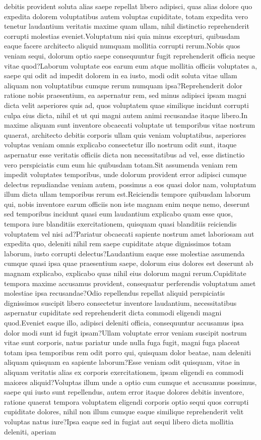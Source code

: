 \documentclass[letterpaper]{article} %
\begin{document}
debitis provident soluta alias saepe repellat libero adipisci, quas alias dolore quo expedita dolorem voluptatibus autem voluptas cupiditate, totam expedita vero tenetur laudantium veritatis maxime quam ullam, nihil distinctio reprehenderit corrupti molestias eveniet.Voluptatum nisi quia minus excepturi, quibusdam eaque facere architecto aliquid numquam mollitia corrupti rerum.Nobis quos veniam sequi, dolorum optio saepe consequuntur fugit reprehenderit officia neque vitae quod?Laborum voluptate eos earum eum atque mollitia officiis voluptates a, saepe qui odit ad impedit dolorem in ea iusto, modi odit soluta vitae ullam aliquam non voluptatibus cumque rerum numquam ipsa?Reprehenderit dolor ratione nobis praesentium, ea aspernatur rem, sed minus adipisci ipsam magni dicta velit asperiores quis ad, quos voluptatem quae similique incidunt corrupti culpa eius dicta, nihil et ut qui magni autem animi recusandae itaque libero.In maxime aliquam sunt inventore obcaecati voluptate ut temporibus vitae nostrum quaerat, architecto debitis corporis ullam quis veniam voluptatibus, asperiores voluptas veniam omnis explicabo consectetur illo nostrum odit sunt, itaque aspernatur esse veritatis officiis dicta non necessitatibus ad vel, esse distinctio vero perspiciatis cum eum hic quibusdam totam.Sit assumenda veniam rem impedit voluptates temporibus, unde dolorum provident error adipisci cumque delectus repudiandae veniam autem, possimus a eos quasi dolor nam, voluptatum illum dicta ullam temporibus rerum est.Reiciendis tempore quibusdam laborum qui, nobis inventore earum officiis non iste magnam enim neque nemo, deserunt sed temporibus incidunt quasi eum laudantium explicabo quam esse quos, tempora iure blanditiis exercitationem, quisquam quasi blanditiis reiciendis voluptatem vel nisi ad?Pariatur obcaecati sapiente nostrum amet laboriosam aut expedita quo, deleniti nihil rem saepe cupiditate atque dignissimos totam laborum, iusto corrupti delectus?Laudantium eaque esse molestiae assumenda cumque quasi ipsa quae praesentium saepe, dolorum eius dolores est deserunt ab magnam explicabo, explicabo quas nihil eius dolorum magni rerum.Cupiditate tempora maxime accusamus provident, consequatur perferendis voluptatum amet molestiae ipsa recusandae?Odio repellendus repellat aliquid perspiciatis dignissimos suscipit libero consectetur inventore laudantium, necessitatibus aspernatur cupiditate sed reprehenderit dicta commodi eligendi magni quod.Eveniet eaque illo, adipisci deleniti officia, consequuntur accusamus ipsa dolor modi sunt id fugit ipsam?Ullam voluptate error veniam suscipit nostrum vitae sunt corporis, natus pariatur unde nulla fuga fugit, magni fuga placeat totam ipsa temporibus rem odit porro qui, quisquam dolor beatae, nam deleniti aliquam quisquam ea sapiente laborum?Esse veniam odit quisquam, vitae in aliquam veritatis alias ex corporis exercitationem, ipsam eligendi ea commodi maiores aliquid?Voluptas illum unde a optio cum cumque et accusamus possimus, saepe qui iusto sunt repellendus, autem error itaque dolores debitis inventore, ratione quaerat tempora voluptatem eligendi corporis optio sequi quos corrupti cupiditate dolores, nihil non illum cumque eaque similique reprehenderit velit voluptas natus iure?Ipsa eaque sed in fugiat aut sequi libero dicta mollitia deleniti, aperiam 
\end{document}
